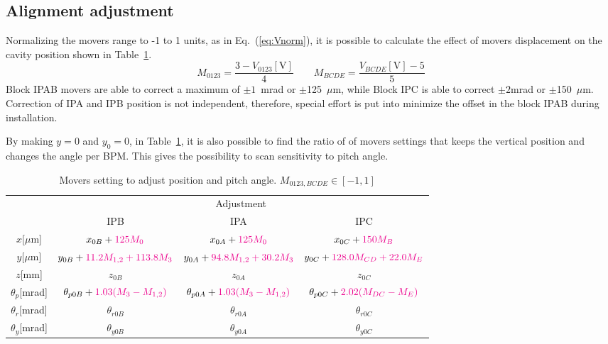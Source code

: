 \subsection{Alignment adjustment}\label{s:alignadj}
Normalizing the movers range to -1 to 1 units, as in Eq.~(\ref{eq:Vnorm}), it is possible to calculate the effect of movers  displacement on the cavity position shown in Table~\ref{t:aligncorr}.
\begin{equation}
 M_{0123}=\frac{3-V_{0123}[\text{V}]}{4} \qquad M_{BCDE}=\frac{V_{BCDE}[\text{V}]-5}{5}\label{eq:Vnorm}
\end{equation}
Block IPAB movers are able to correct a maximum of $\pm1$~mrad or $\pm$125~$\mu$m, while Block IPC is able to correct $\pm2$mrad or $\pm$150~$\mu$m. Correction of IPA and IPB position is not independent, therefore, special effort is put into minimize the offset in the block IPAB during installation.\par
By making $y=0$ and $y_0=0$, in Table~\ref{t:aligncorr}, it is also possible to find the ratio of of movers settings that keeps the vertical position and changes the angle per BPM. This gives the possibility to scan sensitivity to pitch angle.\par
\begin{table}[h]
 \centering
 \begin{tabular}{c||c|c|c}\hline
 &\multicolumn{3}{c}{Adjustment}\\\cline{2-4}
 & IPB & IPA & IPC\\\hline\hline
$x$[$\mu$m] & $x_{0B}+{\color{magenta}125M_0}$ & $x_{0A}+{\color{magenta}125M_0}$&${x_{0C}+\color{magenta}150M_{B}}$\\
$y$[$\mu$m]& $y_{0B}+{\color{magenta}11.2M_{1,2}+113.8M_3}$&$y_{0A}+{\color{magenta}94.8M_{1,2}+30.2M_3}$&$y_{0C}+{\color{magenta}128.0M_{CD}+22.0M_E}$\\
$z$[mm]&$z_{0B}$&$z_{0A}$&$z_{0C}$\\
$\theta_{p}$[mrad]& $\theta_{p0B}+{\color{magenta}1.03(M_3-M_{1,2})}$ & $\theta_{p0A}+{\color{magenta}1.03(M_3-M_{1,2})}$ &$\theta_{p0C}+{\color{magenta} 2.02(M_{DC}-M_E)}$\\
$\theta_{r}$[mrad]&$\theta_{r0B}$&$\theta_{r0A}$&$\theta_{r0C}$\\
$\theta_{y}$[mrad]&$\theta_{y0B}$&$\theta_{y0A}$&$\theta_{y0C}$\\\hline
\end{tabular}\caption{Movers setting to adjust position and pitch angle. $M_{0123,BCDE}\in[-1,1]$}\label{t:aligncorr}
\end{table}

